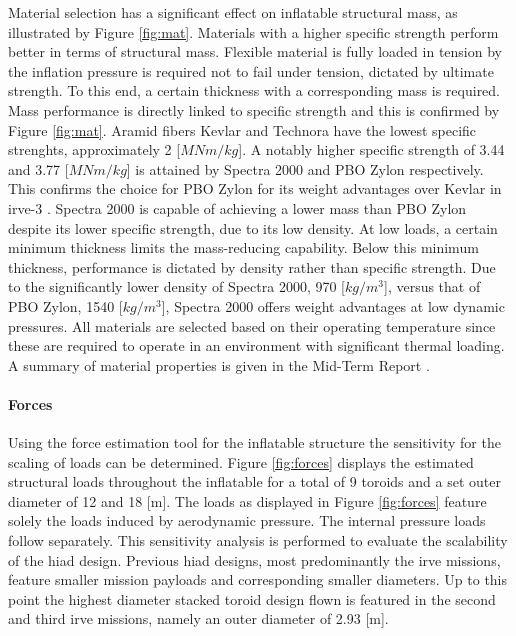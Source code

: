 Material selection has a significant effect on inflatable structural mass, as illustrated by Figure \ref{fig:mat}. Materials with a higher specific strength perform better in terms of structural mass. Flexible material is fully loaded in tension by the inflation pressure is required not to fail under tension, dictated by ultimate strength. To this end, a certain thickness with a corresponding mass is required. Mass performance is directly linked to specific strength and this is confirmed by Figure \ref{fig:mat}. Aramid fibers Kevlar and Technora have the lowest specific strenghts, approximately 2 [$MNm/kg$]. A notably higher specific strength of 3.44 and 3.77 [$MNm/kg$] is attained by Spectra 2000 and PBO Zylon respectively. This confirms the choice for PBO Zylon for its weight advantages over Kevlar in \gls{irve}-3 \cite{Dillman2012a}. Spectra 2000 is capable of achieving a lower mass than PBO Zylon despite its lower specific strength, due to its low density. At low loads, a certain minimum thickness limits the mass-reducing capability. Below this minimum thickness, performance is dictated by density rather than specific strength. Due to the significantly lower density of Spectra 2000, 970 [$kg/m^{3}$], versus that of PBO Zylon, 1540 [$kg/m^{3}$], Spectra 2000 offers weight advantages at low dynamic pressures. All materials are selected based on their operating temperature since these are required to operate in an environment with significant thermal loading. A summary of material properties is given in the Mid-Term Report \cite[p.64]{Balasooriyan2015b}.


\paragraph{Forces}

Using the force estimation tool for the inflatable structure the sensitivity for the scaling of loads can be determined. Figure \ref{fig:forces} displays the estimated structural loads throughout the inflatable for a total of 9 toroids and a set outer diameter of 12 and 18 [m]. The loads as displayed in Figure \ref{fig:forces} feature solely the loads induced by aerodynamic pressure. The internal pressure loads follow separately. This sensitivity analysis is performed to evaluate the scalability of the \gls{hiad} design. Previous \gls{hiad} designs, most predominantly the \gls{irve} missions, feature smaller mission payloads and corresponding smaller diameters. Up to this point the highest diameter stacked toroid design flown is featured in the second and third \gls{irve} missions, namely an outer diameter of 2.93 [m]. 

